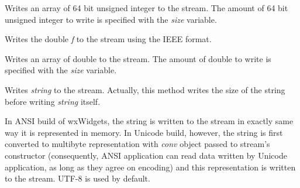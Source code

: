Writes an array of 64 bit unsigned integer to the stream. The amount of
64 bit unsigned integer to write is specified with the {\it size} variable.

\label{wxdataoutputstreamwritedouble}


Writes the double {\it f} to the stream using the IEEE format.


Writes an array of double to the stream. The amount of double to write is
specified with the {\it size} variable.

\label{wxdataoutputstreamwritestring}


Writes {\it string} to the stream. Actually, this method writes the size of
the string before writing {\it string} itself.

In ANSI build of wxWidgets, the string is written to the stream in exactly
same way it is represented in memory. In Unicode build, however, the string
is first converted to multibyte representation with {\it conv} object passed
to stream's constructor (consequently, ANSI application can read data 
written by Unicode application, as long as they agree on encoding) and this
representation is written to the stream. UTF-8 is used by default.

